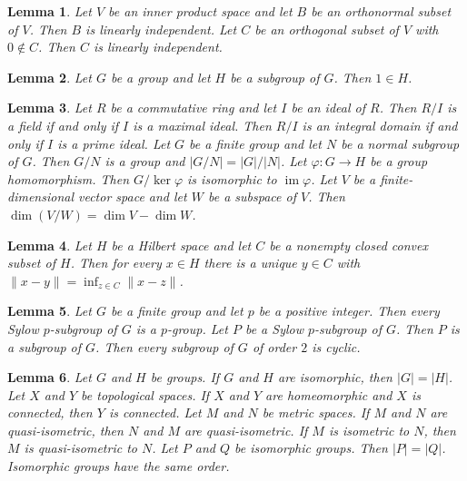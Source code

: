 \documentclass{article}
\newtheorem{lemma}{Lemma}
\begin{document}
\begin{lemma}\label{orthonormal-sets}
Let $V$ be an inner product space and let $B$ be an orthonormal subset of $V$. Then $B$ is linearly independent. Let $C$ be an orthogonal subset of $V$ with $0\notin C$. Then $C$ is linearly independent.
\end{lemma}

\begin{lemma}\label{identity-in-subgroup}
Let $G$ be a group and let $H$ be a subgroup of $G$. Then $1\in H$.
\end{lemma}

\begin{lemma}\label{quotients}
Let $R$ be a commutative ring and let $I$ be an ideal of $R$. Then $R/I$ is a field if and only if $I$ is a maximal ideal. Then $R/I$ is an integral domain if and only if $I$ is a prime ideal. Let $G$ be a finite group and let $N$ be a normal subgroup of $G$. Then $G/N$ is a group and $|G/N|=|G|/|N|$. Let $\varphi\colon G\to H$ be a group homomorphism. Then $G/\ker\varphi$ is isomorphic to $\operatorname{im}\varphi$. Let $V$ be a finite-dimensional vector space and let $W$ be a subspace of $V$. Then $\dim(V/W)=\dim V-\dim W$.
\end{lemma}

\begin{lemma}\label{projection}
Let $H$ be a Hilbert space and let $C$ be a nonempty closed convex subset of $H$. Then for every $x\in H$ there is a unique $y\in C$ with $\|x-y\|=\inf_{z\in C}\|x-z\|$.
\end{lemma}

\begin{lemma}\label{sylow}
Let $G$ be a finite group and let $p$ be a positive integer. Then every Sylow $p$-subgroup of $G$ is a $p$-group. Let $P$ be a Sylow $p$-subgroup of $G$. Then $P$ is a subgroup of $G$. Then every subgroup of $G$ of order $2$ is cyclic.
\end{lemma}

\begin{lemma}\label{pair-relations}
Let $G$ and $H$ be groups. If $G$ and $H$ are isomorphic, then $|G|=|H|$. Let $X$ and $Y$ be topological spaces. If $X$ and $Y$ are homeomorphic and $X$ is connected, then $Y$ is connected. Let $M$ and $N$ be metric spaces. If $M$ and $N$ are quasi-isometric, then $N$ and $M$ are quasi-isometric. If $M$ is isometric to $N$, then $M$ is quasi-isometric to $N$. Let $P$ and $Q$ be isomorphic groups. Then $|P|=|Q|$. Isomorphic groups have the same order.
\end{lemma}
\end{document}
